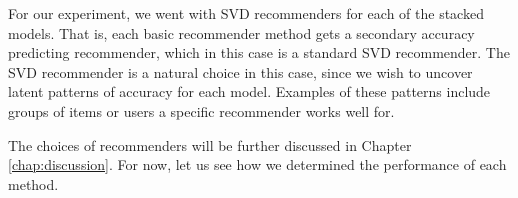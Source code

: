 For our experiment, we went with SVD recommenders
for each of the stacked models.
That is, each basic recommender method gets a secondary 
accuracy predicting recommender, which in this case is a 
standard SVD recommender.
The SVD recommender is a natural choice in this case,
since we wish to uncover latent patterns of accuracy
for each model.
Examples of these patterns include groups of items
or users a specific recommender works well for.

The choices of recommenders will be further discussed
in Chapter \ref{chap:discussion}.
For now, let us see how we determined the performance of each method.



